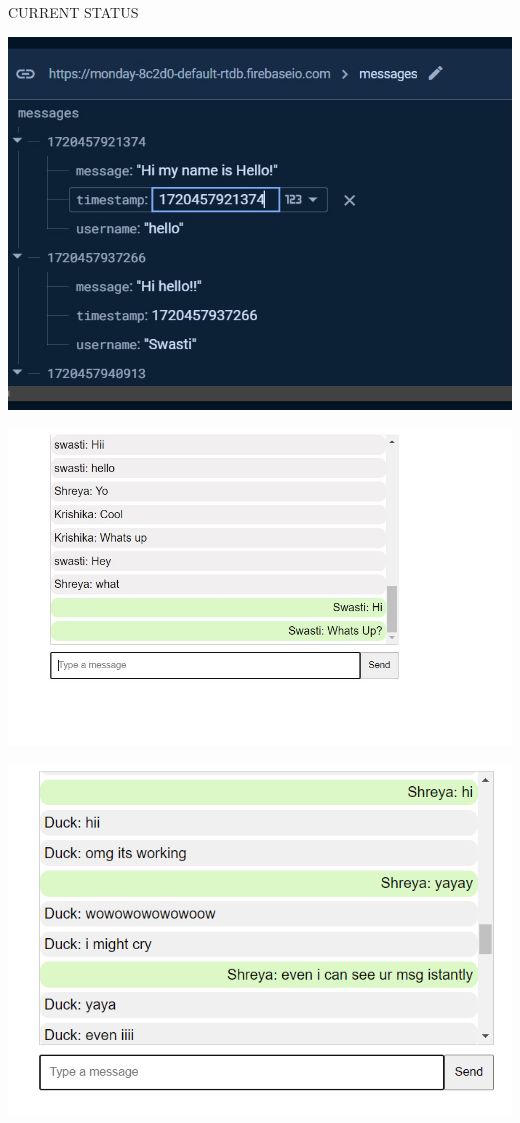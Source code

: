 \documentclass{beamer}
\begin{document}
\begin{frame}{CURRENT STATUS}
    \begin{minipage}[t]{0.3\textwidth}
        \centering
        \includegraphics[width=\textwidth]{firebase.jpg}
    \end{minipage}
    \hfill
    \begin{minipage}[t]{0.3\textwidth}
        \centering
        \includegraphics[width=\textwidth]{chatinterface.jpg}
    \end{minipage}
    \hfill
    \begin{minipage}[t]{0.3\textwidth}
        \centering
        \includegraphics[width=\textwidth]{interface.png}
    \end{minipage}
\end{frame}
\end{document}

